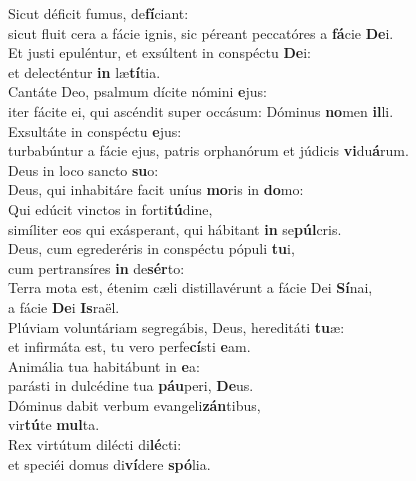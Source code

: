 \evenverse Sicut déficit fumus, de\textbf{fí}ciant:~\*\\
\evenverse sicut fluit cera a fácie ignis, sic péreant peccatóres a \textbf{fá}cie \textbf{De}i.\\
\oddverse Et justi epuléntur, et exsúltent in conspéctu \textbf{De}i:~\*\\
\oddverse et delecténtur \textbf{in} læ\textbf{tí}tia.\\
\evenverse Cantáte Deo, psalmum dícite nómini \textbf{e}jus:~\*\\
\evenverse iter fácite ei, qui ascéndit super occásum: Dóminus \textbf{no}men \textbf{il}li.\\
\oddverse Exsultáte in conspéctu \textbf{e}jus:~\*\\
\oddverse turbabúntur a fácie ejus, patris orphanórum et júdicis \textbf{vi}du\textbf{á}rum.\\
\evenverse Deus in loco sancto \textbf{su}o:~\*\\
\evenverse Deus, qui inhabitáre facit uníus \textbf{mo}ris in \textbf{do}mo:\\
\oddverse Qui edúcit vinctos in forti\textbf{tú}dine,~\*\\
\oddverse simíliter eos qui exásperant, qui hábitant \textbf{in} se\textbf{púl}cris.\\
\evenverse Deus, cum egrederéris in conspéctu pópuli \textbf{tu}i,~\*\\
\evenverse cum pertransíres \textbf{in} de\textbf{sér}to:\\
\oddverse Terra mota est, étenim cæli distillavérunt a fácie Dei \textbf{Sí}nai,~\*\\
\oddverse a fácie \textbf{De}i \textbf{Is}raël.\\
\evenverse Plúviam voluntáriam segregábis, Deus, hereditáti \textbf{tu}æ:~\*\\
\evenverse et infirmáta est, tu vero perfe\textbf{cí}sti \textbf{e}am.\\
\oddverse Animália tua habitábunt in \textbf{e}a:~\*\\
\oddverse parásti in dulcédine tua \textbf{páu}peri, \textbf{De}us.\\
\evenverse Dóminus dabit verbum evangeli\textbf{zán}tibus,~\*\\
\evenverse vir\textbf{tú}te \textbf{mul}ta.\\
\oddverse Rex virtútum dilécti di\textbf{lé}cti:~\*\\
\oddverse et speciéi domus di\textbf{ví}dere \textbf{spó}lia.\\
